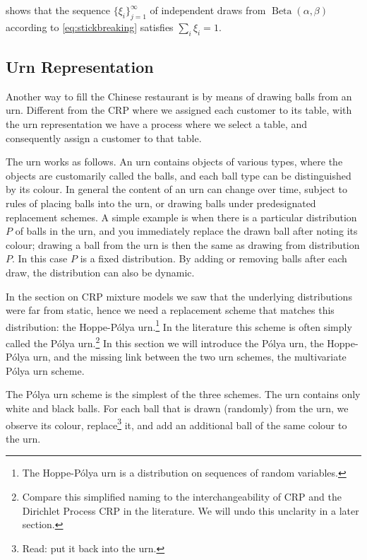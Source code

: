 \textcite{Sethuraman1994A} shows that the sequence $\{\xi_i\}_{j=1}^\infty$  of independent draws from $\operatorname{Beta}(\alpha,\beta)$ according to \cref{eq:stickbreaking} satisfies $\sum_{i} \xi_i = 1$.



\subsection{Urn Representation}
Another way to fill the Chinese restaurant is by means of drawing balls from an urn. Different from the CRP where we assigned each customer to its table, with the urn representation we have a process where we select a table, and consequently assign a customer to that table.

The urn works as follows. An urn contains objects of various types, where the objects are customarily called the balls, and each ball type can be distinguished by its colour. In general the content of an urn can change over time, subject to rules of placing balls into the urn, or drawing balls under predesignated replacement schemes. A simple example is when there is a particular distribution $P$ of balls in the urn, and you immediately replace the drawn ball after noting its colour; drawing a ball from the urn is then the same as drawing from distribution $P$. In this case $P$ is a fixed distribution. By adding or removing balls after each draw, the distribution can also be dynamic.

In the section on CRP mixture models we saw that the underlying distributions were far from static, hence we need a replacement scheme that matches this distribution: the Hoppe-P\'olya urn.\footnote{The Hoppe-P\'olya urn is a distribution on sequences of random variables.} In the literature this scheme is often simply called the P\'olya urn.\footnote{Compare this simplified naming to the interchangeability of CRP and the Dirichlet Process CRP in the literature. We will undo this unclarity in a later section.} In this section we will introduce the P\'olya urn, the Hoppe-P\'olya urn, and the missing link between the two urn schemes, the multivariate P\'olya urn scheme.

The P\'olya urn scheme\cite{Johnson1977Urn} is the simplest of the three schemes. The urn contains only white and black balls. For each ball that is drawn (randomly) from the urn, we observe its colour,  replace\footnote{Read: put it back into the urn.} it, and add an additional ball of the same colour to the urn. 


